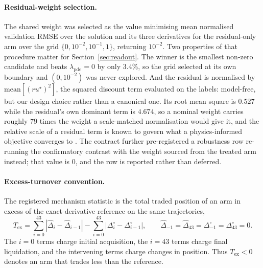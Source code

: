 \documentclass{article}
\begin{document}
\paragraph{Residual-weight selection.} The shared weight was selected as the value
minimising mean normalised validation RMSE over the solution and its
three derivatives for the residual-only arm over the grid
$\{0, 10^{-2}, 10^{-1}, 1\}$, returning $10^{-2}$. Two properties of that procedure
matter for Section~\ref{sec:readout}. The winner is the smallest non-zero candidate
and beats $\lambda_{\mathrm{pde}} = 0$ by only $3.4\%$, so the grid selected at its
own boundary and $(0, 10^{-2})$ was never explored. And the residual is normalised
by $\mathrm{mean}[(ru^{\star})^{2}]$, the squared discount term evaluated on the
labels: model-free, but our design choice rather than a canonical one. Its root mean
square is $0.527$ while the residual's own dominant term is $4.674$, so a nominal
weight carries roughly $79$ times the weight a scale-matched normalisation would
give it, and the relative scale of a residual term is known to govern what a
physics-informed objective converges to \citep{wang2021understanding}. The contract
further pre-registered a robustness row re-running the confirmatory contrast with
the weight sourced from the treated arm instead; that value is $0$, and the row is
reported rather than deferred.

\paragraph{Excess-turnover convention.} The registered mechanism statistic is the
total traded position of an arm in excess of the exact-derivative reference on the
same trajectories,
\begin{equation}\label{eq:tex}
T_{\mathrm{ex}}
=\sum_{i=0}^{43}\left|\widehat{\Delta}_{i}-\widehat{\Delta}_{i-1}\right|
-\sum_{i=0}^{43}\left|\Delta^{\circ}_{i}-\Delta^{\circ}_{i-1}\right|,
\qquad
\widehat{\Delta}_{-1}=\widehat{\Delta}_{43}
=\Delta^{\circ}_{-1}=\Delta^{\circ}_{43}=0.
\end{equation}
The $i=0$ terms charge initial acquisition, the $i=43$ terms charge final
liquidation, and the intervening terms charge changes in position. Thus
$T_{\mathrm{ex}}<0$ denotes an arm that trades less than the reference.
\end{document}
